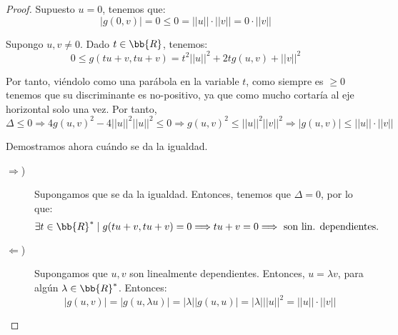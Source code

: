\begin{proof}
    Supuesto $u=0$, tenemos que:
    \begin{equation*}
        |g(0, v)| = 0 \leq 0 = ||u||\cdot ||v|| = 0\cdot ||v||
    \end{equation*}

    Supongo $u,v\neq 0$. Dado $t\in \bb{R}$, tenemos:
    \begin{equation*}
        0\leq g(tu+v, tu+v)= t^2||u||^2 + 2tg(u,v) + ||v||^2
    \end{equation*}

    Por tanto, viéndolo como una parábola en la variable $t$, como siempre es $\geq 0$ tenemos que su discriminante es no-positivo, ya que como mucho cortaría al eje horizontal solo una vez. Por tanto,
    \begin{equation*}
        \Delta \leq 0 \Longrightarrow 4g(u,v)^2 -4||u||^2||u||^2 \leq 0
        \Longrightarrow g(u,v)^2 \leq ||u||^2||v||^2 \Longrightarrow |g(u,v)|\leq ||u||\cdot ||v||
    \end{equation*}

    Demostramos ahora cuándo se da la igualdad.
    \begin{description}
        \item [$\Longrightarrow$)] Supongamos que se da la igualdad. Entonces, tenemos que $\Delta=0$, por lo que:
        \begin{equation*}
            \exists t\in \bb{R}^\ast \mid g(tu+v, tu+v)=0 \Longrightarrow tu+v=0 \Longrightarrow \text{ son lin. dependientes.}
        \end{equation*}
        
        \item [$\Longleftarrow$)] Supongamos que $u,v$ son linealmente dependientes. Entonces, $u=\lambda v$, para algún $\lambda\in \bb{R}^\ast$. Entonces:
        \begin{equation*}
            |g(u,v)| = |g(u,\lambda u)| = |\lambda||g(u,u)|=|\lambda| ||u||^2 = ||u|| \cdot ||v||
        \end{equation*}
    \end{description}
\end{proof}

